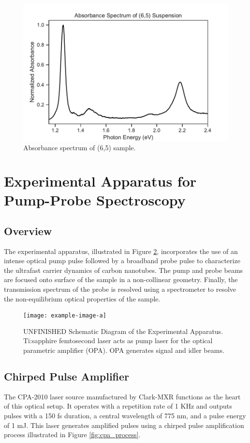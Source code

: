 \begin{figure}[H]
	\centering
	\includegraphics[scale=0.7]{images/chapter_methods/sample_absorbance}
	\caption{ Absorbance spectrum of (6,5) sample.}
	\label{fig:sample_absorbance}
\end{figure}

\section{Experimental Apparatus for Pump-Probe Spectroscopy}

\subsection{Overview}
The experimental apparatus, illustrated in Figure \ref{fig:setup_schematic}, incorporates the use of an intense optical pump pulse followed by a broadband probe pulse to characterize the ultrafast carrier dynamics of carbon nanotubes. The pump and probe beams are focused onto surface of the sample in a non-collinear geometry. Finally, the transmission spectrum of the probe is resolved using a spectrometer to resolve the non-equilibrium optical properties of the sample.


\begin{figure}[h]
	\centering
	\texttt{[image: example-image-a]}
	\caption{{ \color{red} UNFINISHED} Schematic Diagram of the Experimental Apparatus. Ti:sapphire femtosecond laser acts as pump laser for the optical parametric amplifier (OPA). OPA generates signal and idler beams.  }
	\label{fig:setup_schematic}
\end{figure}


\subsection{Chirped Pulse Amplifier}
The CPA-2010 laser source manufactured by Clark-MXR functions as the heart of this optical setup. It operates with a repetition rate of 1 KHz and outputs pulses with a 150 fs duration, a central wavelength of 775 nm, and a pulse energy of 1 mJ. This laser generates amplified pulses using a chirped pulse amplification process illustrated in Figure \ref{fig:cpa_process}.

